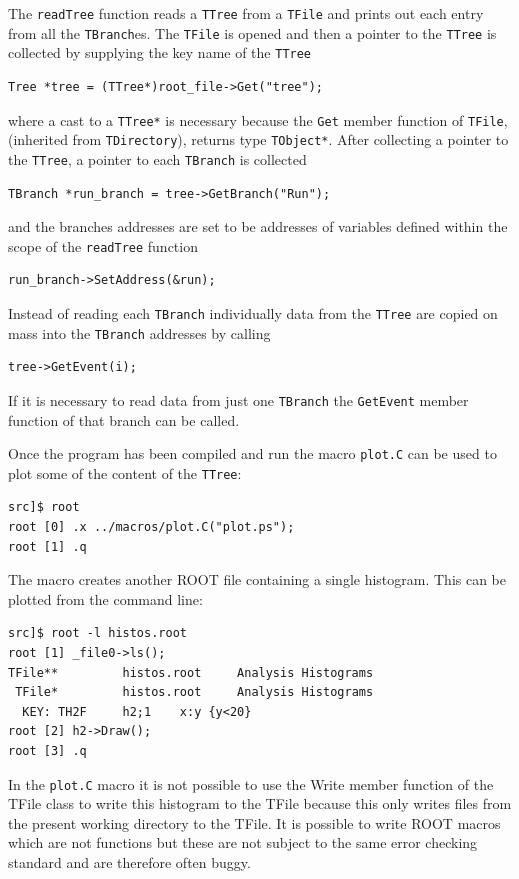 \documentclass[11pt,a4paper]{scrartcl}
\begin{document}
The \texttt{readTree} function reads a \texttt{TTree} from a
\texttt{TFile} and prints out each entry from all the \texttt{TBranch}es.  The \texttt{TFile} is opened and then a pointer to
the \texttt{TTree} is collected by supplying the key name of the
\texttt{TTree}
%
\begin{verbatim}
Tree *tree = (TTree*)root_file->Get("tree");
\end{verbatim}
%
where a cast to a \texttt{TTree*} is necessary because the
\texttt{Get} member function of \texttt{TFile}, (inherited from
\texttt{TDirectory}), returns type \texttt{TObject*}.  After
collecting a pointer to the \texttt{TTree}, a pointer to each
\texttt{TBranch} is collected
%
\begin{verbatim}
TBranch *run_branch = tree->GetBranch("Run");
\end{verbatim}
%
and the branches addresses are set to be addresses of variables defined within
the scope of the \texttt{readTree} function
%
\begin{verbatim}
run_branch->SetAddress(&run);
\end{verbatim}
%
Instead of reading each \texttt{TBranch} individually data from the
\texttt{TTree} are copied on mass into the \texttt{TBranch} addresses
by calling
%
\begin{verbatim}
tree->GetEvent(i); 
\end{verbatim}
If it is necessary to read data from just one \texttt{TBranch} the
\texttt{GetEvent} member function of that branch can be called.

Once the program has been compiled and run the macro \texttt{plot.C}
can be used to plot some of the content of the \texttt{TTree}:
\begin{verbatim}
src]$ root
root [0] .x ../macros/plot.C("plot.ps");
root [1] .q
\end{verbatim} %
The macro creates another ROOT file containing a single histogram.
This can be plotted from the command line:
\begin{verbatim}
src]$ root -l histos.root
root [1] _file0->ls();                                            
TFile**         histos.root     Analysis Histograms
 TFile*         histos.root     Analysis Histograms
  KEY: TH2F     h2;1    x:y {y<20}
root [2] h2->Draw();
root [3] .q
\end{verbatim} %
In the \texttt{plot.C} macro it is not possible to use the Write
member function of the TFile class to write this histogram to the
TFile because this only writes files from the present working
directory to the TFile.  It is possible to write ROOT macros which are
not functions but these are not subject to the same error checking
standard and are therefore often buggy.
\end{document}
